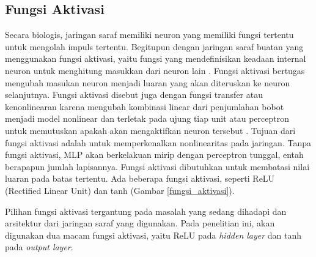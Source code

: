 \subsection{Fungsi Aktivasi}
Secara biologis, jaringan saraf memiliki neuron yang memiliki fungsi tertentu untuk mengolah impuls tertentu. Begitupun dengan jaringan saraf buatan yang menggunakan fungsi aktivasi, yaitu fungsi yang mendefinisikan keadaan internal neuron untuk menghitung masukkan dari neuron lain \citep{zocca_spacagna_slater_roelants_2017}. Fungsi aktivasi bertugas mengubah masukan neuron menjadi luaran yang akan diteruskan ke neuron selanjutnya. Fungsi aktivasi disebut juga dengan fungsi transfer atau kenonlinearan karena mengubah kombinasi linear dari penjumlahan bobot menjadi model nonlinear dan terletak pada ujung tiap unit atau perceptron untuk memutuskan apakah akan mengaktifkan neuron tersebut \citep{elgendy_2020}. Tujuan dari fungsi aktivasi adalah untuk memperkenalkan nonlinearitas pada jaringan. Tanpa fungsi aktivasi, MLP akan berkelakuan mirip dengan perceptron tunggal, entah berapapun jumlah lapisannya. Fungsi aktivasi dibutuhkan untuk membatasi nilai luaran pada batas tertentu. Ada beberapa fungsi aktivasi, seperti ReLU (Rectified Linear Unit) dan tanh (Gambar \ref{fungsi_aktivasi}). 

Pilihan fungsi aktivasi tergantung pada masalah yang sedang dihadapi dan arsitektur dari jaringan saraf yang digunakan. Pada penelitian ini, akan digunakan dua macam fungsi aktivasi, yaitu ReLU pada \emph{hidden layer} dan tanh pada \emph{output layer}.

